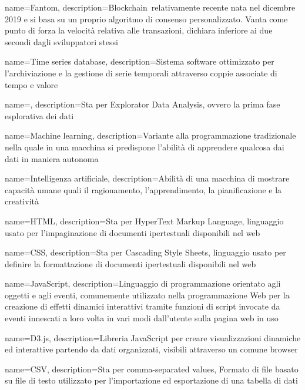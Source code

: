 {
	name={Fantom},
	description={Blockchain\glo\ relativamente recente nata nel dicembre 2019 e si basa su un proprio algoritmo di consenso personalizzato. Vanta come punto di forza la velocità relativa alle transazioni, dichiara inferiore ai due secondi dagli sviluppatori stessi}
}

{
	name={Time series database},
	description={Sistema software ottimizzato per l'archiviazione e la gestione di serie temporali attraverso coppie associate di tempo e valore}
}

\newglossaryentry{}
{
	name={},
	description={Sta per Explorator Data Analysis, ovvero la prima fase esplorativa dei dati}
}

{
	name={Machine learning},
	description={Variante alla programmazione tradizionale nella quale in una macchina si predispone l'abilità di apprendere qualcosa dai dati in maniera autonoma}
}

{
	name={Intelligenza artificiale},
	description={Abilità di una macchina di mostrare capacità umane quali il ragionamento, l'apprendimento, la pianificazione e la creatività}
}

{
	name={HTML},
	description={Sta per HyperText Markup Language, linguaggio usato per l'impaginazione di documenti ipertestuali disponibili nel web}
}

{
	name={CSS},
	description={Sta per Cascading Style Sheets, linguaggio usato per definire la formattazione di documenti ipertestuali disponibili nel web}
}

{
	name={JavaScript},
	description={Linguaggio di programmazione orientato agli oggetti e agli eventi, comunemente utilizzato nella programmazione Web per la creazione di effetti dinamici interattivi tramite funzioni di script invocate da eventi innescati a loro volta in vari modi dall'utente sulla pagina web in uso}
}

{
	name={D3.js},
	description={Libreria JavaScript per creare visualizzazioni dinamiche ed interattive partendo da dati organizzati, visibili attraverso un comune browser}
}

{
	name={CSV},
	description={Sta per comma-separated values, Formato di file basato su file di testo utilizzato per l'importazione ed esportazione di una tabella di dati}
}

